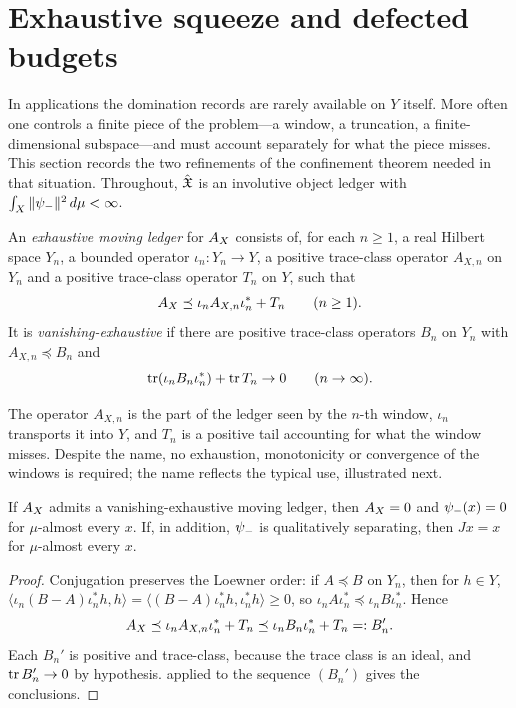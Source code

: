 \section{Exhaustive squeeze and defected budgets}
\label{sec:exhaustive_squeeze_and_budgets}

In applications the domination records are rarely available on \(Y\)
itself.  More often one controls a finite piece of the problem---a
window, a truncation, a finite-dimensional subspace---and must account
separately for what the piece misses.  This section records the two
refinements of the confinement theorem needed in that situation.
Throughout, \(\hat{\mathfrak{X}}\) is an involutive object ledger with
\(\int_X\|\psi_{-}\|^2\,d\mu<\infty\).

\begin{definition}
\label{def:duality_confinement:exhaustive-moving-ledger}
An \emph{exhaustive moving ledger} for \(A_{X}\) consists of, for each
\(n\geq1\), a real Hilbert space \(Y_n\), a bounded operator
\(\iota_n:Y_n\to Y\), a positive trace-class operator \(A_{X,n}\) on
\(Y_n\) and a positive trace-class operator \(T_n\) on \(Y\), such that
\[
  A_{X}\preceq\iota_nA_{X,n}\iota_n^*+T_n\qquad(n\geq1).
\]
It is \emph{vanishing-exhaustive} if there are positive trace-class
operators \(B_n\) on \(Y_n\) with \(A_{X,n}\preceq B_n\) and
\[
  \operatorname{tr}(\iota_nB_n\iota_n^*)+\operatorname{tr} T_n\to0\qquad(n\to\infty).
\]
\end{definition}

The operator \(A_{X,n}\) is the part of the ledger seen by the
\(n\)-th window, \(\iota_n\) transports it into \(Y\), and \(T_n\) is a
positive tail accounting for what the window misses.  Despite the
name, no exhaustion, monotonicity or convergence of the windows is
required; the name reflects the typical use, illustrated next.

\begin{theorem}
\label{thm:duality_confinement:exhaustive-squeeze}
If \(A_{X}\) admits a vanishing-exhaustive moving ledger, then
\(A_{X}=0\) and \(\psi_{-}(x)=0\) for \(\mu\)-almost every \(x\).  If, in
addition, \(\psi_{-}\) is qualitatively separating, then \(Jx=x\) for
\(\mu\)-almost every \(x\).
\end{theorem}

\begin{proof}
Conjugation preserves the Loewner order: if \(A\preceq B\) on \(Y_n\),
then for \(h\in Y\),
\(\langle\iota_n(B-A)\iota_n^*h,h\rangle
=\langle(B-A)\iota_n^*h,\iota_n^*h\rangle\geq0\), so
\(\iota_nA\iota_n^*\preceq\iota_nB\iota_n^*\).  Hence
\[
  A_{X}\preceq\iota_nA_{X,n}\iota_n^*+T_n
  \preceq\iota_nB_n\iota_n^*+T_n=:B_n' .
\]
Each \(B_n'\) is positive and trace-class, because the trace class is
an ideal, and \(\operatorname{tr} B_n'\to0\) by hypothesis.
 applied to the sequence
\((B_n')\) gives the conclusions.
\end{proof}

